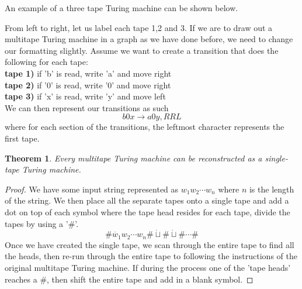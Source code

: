 \documentclass[12pt, letterpaper]{article}
\newtheorem{thm}{Theorem}[section]
\begin{document}
An example of a three tape Turing machine can be shown below.
\begin{center}
\end{center}
From left to right, let us label each tape 1,2 and 3. If we are to draw out a multitape Turing machine in a graph as we have done before, we need to change our formatting slightly. Assume we want to create a transition that does the following for each tape:\\
\textbf{tape 1) } if 'b' is read, write 'a' and move right\\
\textbf{tape 2) } if '0' is read, write '0' and move right\\
\textbf{tape 3) } if 'x' is read, write 'y' and move left\\
We can then represent our transitions as such
\[ b0x \rightarrow a0y, RRL \]
where for each section of the transitions, the leftmost character represents the first tape.
\begin{thm}
Every multitape Turing machine can be reconstructed as a single-tape Turing machine.
\end{thm}
\begin{proof}
We have some input string represented as $w_1w_2 \cdots w_n$ where $n$ is the length of the string. We then place all the separate tapes onto a single tape and add a dot on top of each symbol where the tape head resides for each tape, divide the tapes by using a '$\#$'. 
\[ \#\dot{w_1}w_2 \cdots w_n \# \dot{\sqcup} \# \dot{\sqcup} \# \cdots \# \]
Once we have created the single tape, we scan through the entire tape to find all the heads, then re-run through the entire tape to following the instructions of the original multitape Turing machine. If during the process one of the 'tape heads' reaches a $\#$, then shift the entire tape and add in a blank symbol.
\end{proof}
\end{document}
